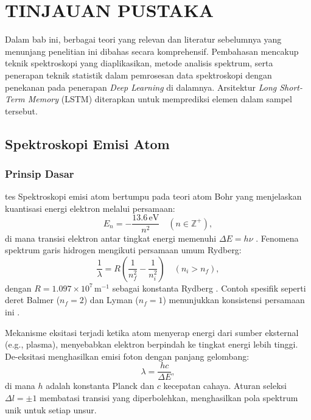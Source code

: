 \chapter{TINJAUAN PUSTAKA}
\par Dalam bab ini, berbagai teori yang relevan dan literatur sebelumnya yang menunjang penelitian ini dibahas secara komprehensif. Pembahasan mencakup teknik spektroskopi yang diaplikasikan, metode analisis spektrum, serta penerapan teknik statistik dalam pemrosesan data spektroskopi dengan penekanan pada penerapan \textit{Deep Learning} di dalamnya. Arsitektur \textit{Long Short-Term Memory} (LSTM) diterapkan untuk memprediksi elemen dalam sampel tersebut.

\section{Spektroskopi Emisi Atom}
\subsection{Prinsip Dasar}
\label{subsec:prinsip-dasar}

tes Spektroskopi emisi atom bertumpu pada teori atom Bohr yang menjelaskan kuantisasi energi elektron melalui persamaan:
\begin{equation}
\label{eq:energi-bohr}
E_n = -\frac{13.6 \, \text{eV}}{n^2} \quad (n \in \mathbb{Z}^+),
\end{equation}
di mana transisi elektron antar tingkat energi memenuhi $\Delta E = h\nu$ \citep{Beiser1992}. Fenomena spektrum garis hidrogen mengikuti persamaan umum Rydberg:
\begin{equation}
\label{eq:rydberg-umum}
\frac{1}{\lambda} = R \left( \frac{1}{n_f^2} - \frac{1}{n_i^2} \right) \quad (n_i > n_f),
\end{equation}
dengan $R = 1.097 \times 10^7 \, \text{m}^{-1}$ sebagai konstanta Rydberg \citep{Beiser1992}. Contoh spesifik seperti deret Balmer ($n_f = 2$) dan Lyman ($n_f = 1$) menunjukkan konsistensi persamaan ini \citep{Griffiths2005}.

Mekanisme eksitasi terjadi ketika atom menyerap energi dari sumber eksternal (e.g., plasma), menyebabkan elektron berpindah ke tingkat energi lebih tinggi. De-eksitasi menghasilkan emisi foton dengan panjang gelombang:
\[
\lambda = \frac{hc}{\Delta E},
\]
di mana $h$ adalah konstanta Planck dan $c$ kecepatan cahaya. Aturan seleksi $\Delta l = \pm 1$ \citep{Liboff2003} membatasi transisi yang diperbolehkan, menghasilkan pola spektrum unik untuk setiap unsur.

